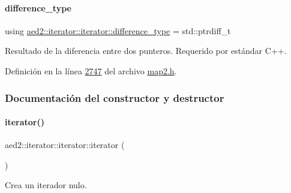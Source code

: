 \paragraph{\texorpdfstring{difference\+\_\+type}{difference\_type}}
{\footnotesize\ttfamily using \hyperlink{classaed2_1_1iterator_1_1iterator_a7dc57879d054ca0168a20003c9d655b6_a7dc57879d054ca0168a20003c9d655b6}{aed2\+::iterator\+::iterator\+::difference\+\_\+type} =  std\+::ptrdiff\+\_\+t}



Resultado de la diferencia entre dos punteros. Requerido por estándar C++. 



Definición en la línea \hyperlink{map2_8h_source_l02747}{2747} del archivo \hyperlink{map2_8h_source}{map2.\+h}.



\subsubsection{Documentación del constructor y destructor}
\mbox{\label{classaed2_1_1iterator_1_1iterator_ae488782067dfba96b447080b0db1ed2c_ae488782067dfba96b447080b0db1ed2c}} 
\paragraph{\texorpdfstring{iterator()}{iterator()}\hspace{0.1cm}{\footnotesize\ttfamily [1/2]}}
{\footnotesize\ttfamily aed2\+::iterator\+::iterator\+::iterator (\begin{DoxyParamCaption}{ }\end{DoxyParamCaption})\hspace{0.3cm}{\ttfamily [inline]}}



Crea un iterador nulo. 

